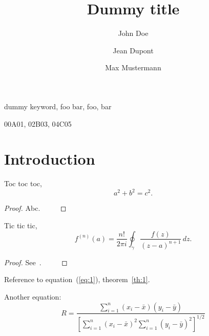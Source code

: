 \documentclass{etna}
\title{Dummy title}
\author{John Doe\footnotemark[1]
\and
Jean Dupont\footnotemark[1]
\and
Max Mustermann\footnotemark[2]
}
\begin{document}
\maketitle



\begin{abstract}
  \lipsum[1]
\end{abstract}

\begin{keywords}
   dummy keyword, foo bar, foo, bar
\end{keywords}

\begin{AMS}
  00A01, 02B03, 04C05
\end{AMS}

\section{Introduction}
\lipsum[2]

\begin{theorem}[Pythagoras]
Toc toc toc,
\begin{equation}
a^2 + b^2 = c^2.
\end{equation}
\end{theorem}
\begin{proof}
  Abc. $\qquad$
\end{proof}

\lipsum[3]

\begin{theorem}[Cauchy]\label{th:1}
  Tic tic tic,
  \begin{equation}\label{eq:1}
    f^{(n)}(a) = \frac{n!}{2\pi i} \oint_\gamma \frac{f(z)}{(z-a)^{n+1}}\, dz.
  \end{equation}
\end{theorem}
\begin{proof}
See~\cite{MR2882785}. $\qquad$
\end{proof}

Reference to equation~(\ref{eq:1}), theorem~\ref{th:1}.

Another equation:
\begin{equation}
  R = \frac{\displaystyle{\sum_{i=1}^n (x_i-\bar{x})(y_i-
\bar{y})}}{\displaystyle{\left[
\sum_{i=1}^n(x_i-\bar{x})^2
\sum_{i=1}^n(y_i-\bar{y})^2\right]^{1/2}}}
\end{equation}
\end{document}
